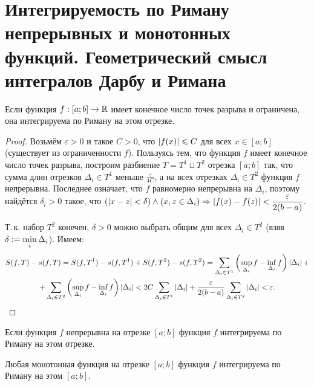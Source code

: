 \section{Интегрируемость по Риману непрерывных и монотонных функций. Геометрический смысл интегралов Дарбу и Римана}

\begin{statement}
    Если функция $f: [a; b] \to \mathbb{R}$ имеет конечное число точек разрыва и ограничена, она интегрируема по Риману на этом отрезке.
\end{statement}

\begin{proof}
    Возьмём $\varepsilon > 0$ и такое $C > 0$, что $\left\lvert f(x)\right\rvert \leqslant C$ для всех $x \in [a; b]$ (существует из ограниченности $f$). Пользуясь тем, что функция $f$ имеет конечное число точек разрыва, построим разбиение $T = T^1 \sqcup T^2$ отрезка $[a; b]$ так, что сумма длин отрезков $\Delta_i \in T^1$ меньше $\frac{\varepsilon}{4C}$, а на всех отрезках $\Delta_i \in T^2$ функция $f$ непрерывна. Последнее означает, что $f$ равномерно непрерывна на $\Delta_i$, поэтому найдётся $\delta_i > 0$ такое, что $\displaystyle\left(\left\lvert x - z\right\rvert < \delta\right) \wedge \left(x, z \in \Delta_i\right) \Rightarrow \left\lvert f(x) - f(z)\right\rvert < \frac{\varepsilon}{2(b - a)}$.

    Т.\,к. набор $T^2$ конечен, $\delta > 0$ можно выбрать общим для всех $\Delta_i \in T^2$ (взяв $\delta \vcentcolon = \min\limits_{i}\Delta_i$). Имеем:
    \begin{multline*}
        S(f, T) - s(f, T) = S(f, T^1) - s(f, T^1) + S(f, T^2) - s(f, T^2) = \sum_{\Delta_i \in T^1}\left(\sup_{\Delta_i}f - \inf\limits_{\Delta_i}f\right)\left\lvert\Delta_i\right\rvert +\\ + \sum_{\Delta_i \in T^2}\left(\sup_{\Delta_i}f - \inf_{\Delta_i}f\right)\left\lvert\Delta_i\right\rvert < 2C\sum_{\Delta_i \in T^1}\left\lvert\Delta_i\right\rvert + \frac{\varepsilon}{2(b - a)}\sum_{\Delta_i \in T^2}\left\lvert\Delta_i\right\rvert < \varepsilon.
    \end{multline*}
\end{proof}

\begin{corollary}
    Если функция $f$ непрерывна на отрезке $[a; b]$ функция $f$ интегрируема по Риману на этом отрезке.
\end{corollary}

\begin{statement}
    Любая монотонная функция на отрезке $[a; b]$ функция $f$ интегрируема по Риману на этом $[a; b]$.
\end{statement}

